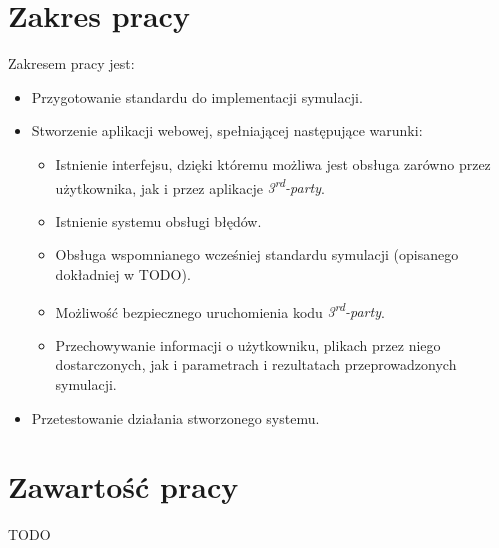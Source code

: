 \section{Zakres pracy}
\label{sec:zakresPracy}

Zakresem pracy jest:
\begin{itemize}
	\item Przygotowanie standardu do implementacji symulacji.
	\item Stworzenie aplikacji webowej, spełniającej następujące warunki:
	      \begin{itemize}
		      \item Istnienie interfejsu, dzięki któremu możliwa jest obsługa zarówno przez użytkownika, jak i przez aplikacje \emph{3\textsuperscript{rd}-party}.
		      \item Istnienie systemu obsługi błędów.
		      \item Obsługa wspomnianego wcześniej standardu symulacji (opisanego dokładniej w TODO). %
		      \item Możliwość bezpiecznego uruchomienia kodu \emph{3\textsuperscript{rd}-party}.
		      \item Przechowywanie informacji o użytkowniku, plikach przez niego dostarczonych, jak i parametrach i rezultatach przeprowadzonych symulacji.
	      \end{itemize}
	\item Przetestowanie działania stworzonego systemu.
\end{itemize}


\section{Zawartość pracy}
\label{sec:zawartoscPracy}

TODO %